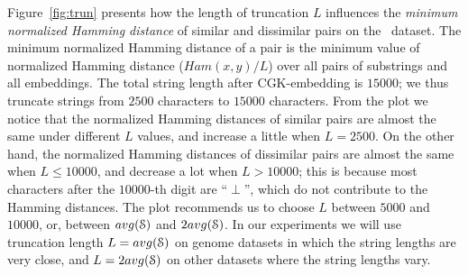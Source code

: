 Figure~\ref{fig:trun} presents how the length of truncation $L$ influences the {\em minimum normalized Hamming distance} of similar and dissimilar pairs on the \genoa\ dataset. The minimum normalized Hamming distance of a pair is the minimum value of normalized Hamming distance ($Ham(x,y)/L$) over all pairs of substrings and all embeddings.  The total string length after CGK-embedding is $15000$; we thus truncate strings from $2500$ characters to $15000$ characters. 
From the plot we notice that the normalized Hamming distances of similar pairs are almost the same under different $L$ values, and increase a little when $L = 2500$. On the other hand, the normalized Hamming distances of dissimilar pairs are almost the same when $L \le 10000$, and decrease a lot when $L > 10000$; this is because most characters after the $10000$-th digit are ``$\perp$'', which do not contribute to the Hamming distances. The plot recommends us to choose $L$ between $5000$ and $10000$, or, between $avg(\S)$ and $2 avg(\S)$.  In our experiments we will use truncation length $L=avg(\S)$ on genome datasets in which the string lengths are very close, and $L=2 avg(\S)$ on other datasets where the string lengths vary.




\begin{table*}[t]
\centering
{}
  \caption{Accuracy of \ebdjoin+, \uniref\ dataset, $K=20, \Delta = 50$}
\label{tab:uniacc}
\end{table*}


